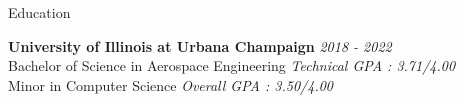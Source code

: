 \documentclass{resume} %
\begin{document}

    \begin{rSection}{Education}

        {\textbf{University of Illinois at Urbana Champaign}} \hfill {\em 2018 - 2022}\\
        Bachelor of Science in Aerospace Engineering \hfill {\em Technical GPA : 3.71/4.00} \\
        Minor in Computer Science \hfill {\em Overall GPA : 3.50/4.00}


    \end{rSection}
\end{document}
